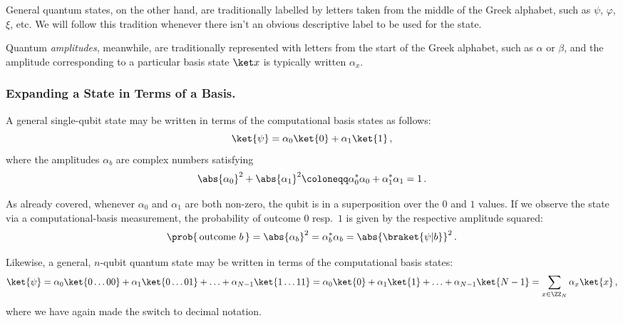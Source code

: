       General quantum states, on the other hand, are traditionally labelled by
        letters taken from the middle of the Greek alphabet, such as $\psi$,
        $\varphi$, $\xi$, etc.  We will follow this tradition whenever 
        there isn't an obvious descriptive label to be used for the state.

      Quantum \emph{amplitudes}, meanwhile, are traditionally represented with letters 
        from the start of the Greek alphabet, such as $\alpha$ or $\beta$, and
        the amplitude corresponding to a particular basis state $\ket x$ is typically written
        $\alpha_x$.

    \subsubsection{Expanding a State in Terms of a Basis.} 
      A general single-qubit state may be written in terms of the computational
        basis states as follows:
      \[
        \ket{\psi} = \alpha_0 \ket{0} + \alpha_1 \ket{1}\, ,
      \]
      where the amplitudes $\alpha_b$ are complex numbers satisfying
      \[
        \abs{\alpha_0}^2 + \abs{\alpha_1}^2 
          \coloneqq \alpha_0^*\alpha_0 + \alpha_1^*\alpha_1 = 1\, . 
      \]

      As already covered, whenever $\alpha_0$ and $\alpha_1$ are both non-zero, 
        the qubit is in a superposition over the $0$ and
        $1$ values. If we observe the state via a computational-basis
        measurement, the probability of outcome $0$ resp.\ $1$ is given by
        the respective amplitude squared: 
      \[
        \prob{\, \text{outcome } b\, } = \abs{\alpha_b}^2 
          = \alpha_b^* \alpha_b = \abs{\braket{\psi |b}}^2\, .
      \]

      Likewise, a general, $n$-qubit quantum state may be written in terms of the computational
        basis states:
      \[
        \ket{\psi} 
          = \alpha_0 \ket{0 \dots 00} + \alpha_1 \ket{0 \dots 01} + \ldots +
          \alpha_{N-1} \ket{1 \dots 11}
          = \alpha_0 \ket{0} + \alpha_1 \ket{1} + \ldots +
          \alpha_{N-1} \ket{N-1}
          = \sum_{x \in \ZZ_N} \alpha_x \ket{x}\, ,
      \]
      where we have again made the switch to decimal notation.

